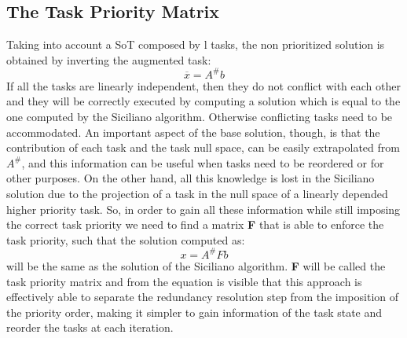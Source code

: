 \documentclass[12pt, a4paper]{article}
\begin{document}
\subsection{The Task Priority Matrix}

Taking into account a SoT composed by l tasks, the non prioritized solution is obtained by inverting the augmented task:
\[
\overline{x} = A^\#b\]
If all the tasks are linearly independent, then they do not conflict with each other and they will be correctly executed by computing a solution which is equal to the one computed by the Siciliano algorithm. Otherwise conflicting tasks need to be accommodated.
An important aspect of the base solution, though, is that the contribution of each task and the task null space, can be easily extrapolated from $A^\#$, and this information can be useful when tasks need to be reordered or for other purposes. On the other hand, all this knowledge is lost in the Siciliano solution due to the projection of a task in the null space of a linearly depended higher priority task. 
So, in order to gain all these information while still imposing the correct task priority we need to find a matrix \textbf{F} that is able to enforce the task priority, such that the solution computed as: \[x = A^\#Fb\]
will be the same as the solution of the Siciliano algorithm.
\textbf{F} will be called the task priority matrix and from the equation is visible that this approach is effectively able to separate the redundancy resolution step from the imposition of the priority order, making it simpler to gain information of the task state and reorder the tasks at each iteration.
\end{document}
